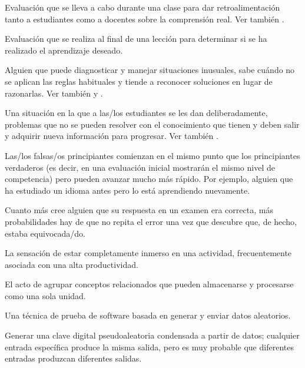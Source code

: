 \begin{description}
 Evaluación que se lleva a cabo
durante una clase para dar retroalimentación tanto a estudiantes como a docentes
sobre la comprensión real. Ver también .

 Evaluación que se realiza al final de una 
lección para determinar si se ha realizado el aprendizaje deseado.

 Alguien que puede diagnosticar y manejar situaciones inusuales, 
sabe cuándo no se aplican las reglas habituales y tiende a reconocer soluciones en lugar de razonarlas.
Ver también 
y .

 Una situación en la que a las/los estudiantes se les dan deliberadamente, 
problemas que no se pueden resolver con el conocimiento que tienen y deben salir y adquirir nueva información para progresar.
Ver también .

 Las/los falsas/os principiantes comienzan en el mismo punto que los principiantes 
verdaderos (es decir, en una evaluación inicial mostrarán el mismo nivel de competencia) pero pueden avanzar mucho más rápido.
Por ejemplo, alguien que ha estudiado un idioma antes pero lo está aprendiendo nuevamente. 

 Cuanto más cree alguien
que su respuesta en un examen era correcta, más probabilidades hay de que no
repita el error una vez que descubre que, de hecho, estaba equivocada/do.

 La sensación de estar completamente inmerso en una actividad,
frecuentemente asociada con una alta productividad.

 El acto de agrupar conceptos relacionados
que pueden almacenarse y procesarse como una sola unidad.

 Una técnica de prueba de software
basada en generar y enviar datos aleatorios.

 Generar una clave digital pseudoaleatoria condensada a partir de datos; cualquier entrada específica produce la misma salida, pero es muy probable que diferentes entradas produzcan diferentes salidas.


\end{description}
